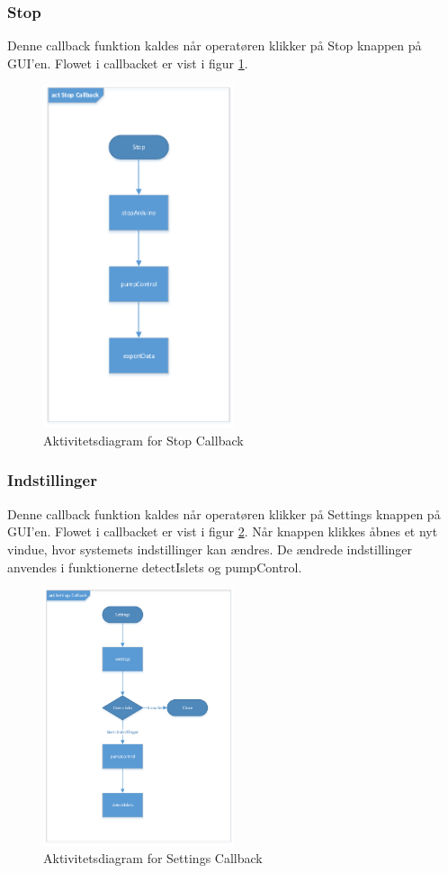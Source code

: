 \subsubsection{Stop}
Denne callback funktion kaldes når operatøren klikker på Stop knappen på GUI'en. Flowet i callbacket er vist i figur \ref{fig:act_stop}.
\begin{figure}[H]
	\centering
	\includegraphics[width=0.5\textwidth]{billeder/act_stop-crop.pdf}
	\caption{Aktivitetsdiagram for Stop Callback}
	\label{fig:act_stop}
\end{figure}

\newpage
\subsubsection{Indstillinger}
Denne callback funktion kaldes når operatøren klikker på Settings knappen på GUI'en. Flowet i callbacket er vist i figur \ref{fig:act_settings}. Når knappen klikkes åbnes et nyt vindue, hvor systemets indstillinger kan ændres. De ændrede indstillinger anvendes i funktionerne detectIslets og pumpControl. 
\begin{figure}[H]
	\centering
	\includegraphics[width=0.5\textwidth]{billeder/act_settings-crop.pdf}
	\caption{Aktivitetsdiagram for Settings Callback}
	\label{fig:act_settings}
\end{figure}
